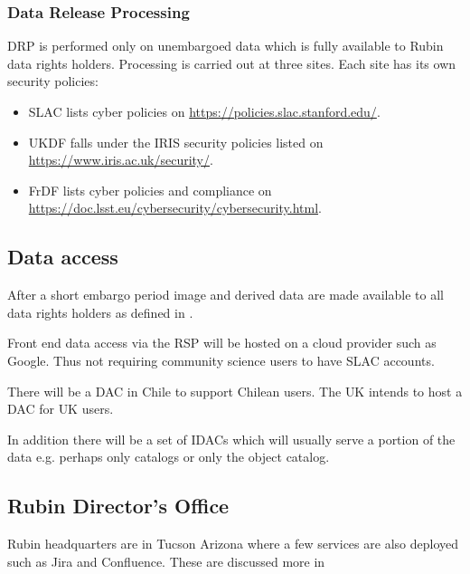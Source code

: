 \subsubsection{Data Release Processing}
DRP is performed only on unembargoed data which is fully available to Rubin data rights holders.
Processing is carried out at three sites.
Each site has its own security policies:

\begin{itemize}
\item SLAC lists cyber policies on \url{https://policies.slac.stanford.edu/}.
\item UKDF falls under the \gls{IRIS} security policies listed on \url{https://www.iris.ac.uk/security/}.
\item FrDF lists cyber policies and compliance on \url{https://doc.lsst.eu/cybersecurity/cybersecurity.html}.
\end{itemize}



\subsection{Data access}
After a short embargo period image and derived data are made available to all
data rights holders as defined in .

Front end data access via the \gls{RSP} will be hosted on a \gls{cloud} provider such as Google.
Thus not requiring community science users to have \gls{SLAC} accounts.

There will  be a \gls{DAC} in Chile to support Chilean users.
The \gls{UK} intends to host a DAC for \gls{UK} users.

In addition there will be a set of \gls{IDAC}s which will usually serve a portion of the data e.g. perhaps only catalogs or only the object catalog.


\subsection{Rubin \gls{Director}'s Office}
Rubin headquarters are in Tucson Arizona where a few services are also deployed such as Jira and Confluence.
These are discussed more in 

